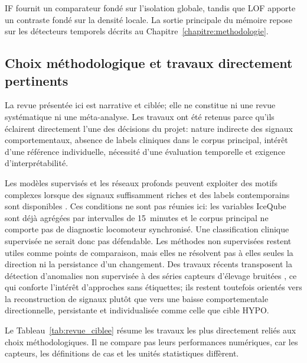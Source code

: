 IF fournit un comparateur fondé sur l'isolation globale, tandis que LOF apporte un contraste
fondé sur la densité locale. La sortie principale du mémoire repose sur les détecteurs
temporels décrits au Chapitre~\ref{chapitre:methodologie}.

\subsection{Choix méthodologique et travaux directement pertinents}

La revue présentée ici est narrative et ciblée; elle ne constitue ni une revue systématique
ni une méta-analyse. Les travaux ont été retenus parce qu'ils éclairent directement l'une
des décisions du projet: nature indirecte des signaux comportementaux, absence de labels
cliniques dans le corpus principal, intérêt d'une référence individuelle, nécessité d'une
évaluation temporelle et exigence d'interprétabilité.

Les modèles supervisés et les réseaux profonds peuvent exploiter des motifs complexes lorsque
des signaux suffisamment riches et des labels contemporains sont disponibles
\citep{vanhertem2014evaluation,balasso2023behaviour}. Ces conditions ne sont pas réunies
ici: les variables IceQube sont déjà agrégées par intervalles de 15~minutes et le corpus
principal ne comporte pas de diagnostic locomoteur synchronisé. Une classification clinique
supervisée ne serait donc pas défendable. Les méthodes non supervisées restent utiles comme
points de comparaison, mais elles ne résolvent pas à elles seules la direction ni la
persistance d'un changement. Des travaux récents transposent la détection d'anomalies non
supervisée à des séries capteurs d'élevage bruitées \citep{kakar2024timetector}, ce qui
conforte l'intérêt d'approches sans étiquettes; ils restent toutefois orientés vers la
reconstruction de signaux plutôt que vers une baisse comportementale directionnelle,
persistante et individualisée comme celle que cible HYPO.

Le Tableau~\ref{tab:revue_ciblee} résume les travaux les plus directement reliés aux choix
méthodologiques. Il ne compare pas leurs performances numériques, car les capteurs, les
définitions de cas et les unités statistiques diffèrent.

